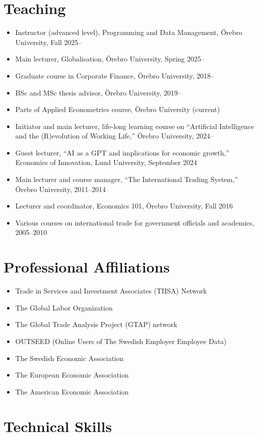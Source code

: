 \documentclass[11pt,a4paper]{article}
\newcommand{\cventry}[1]{\item #1}
\begin{document}
\section{Teaching}

\begin{itemize}
\cventry{Instructor (advanced level), Programming and Data Management, Örebro University, Fall 2025--}
 \cventry{Main lecturer, Globalisation, Örebro University, Spring 2025--}
 \cventry{Graduate course in Corporate Finance, Örebro University, 2018--}
 \cventry{BSc and MSc thesis advisor, Örebro University, 2019--}
 \cventry{Parts of Applied Econometrics course, Örebro University (current)}
 \cventry{Initiator and main lecturer, life-long learning course on ``Artificial Intelligence and the (R)evolution of Working Life,'' Örebro University, 2024--}
 \cventry{Guest lecturer, ``AI as a GPT and implications for economic growth,'' Economics of Innovation, Lund University, September 2024}
 \cventry{Main lecturer and course manager, ``The International Trading System,'' Örebro University, 2011--2014}
 \cventry{Lecturer and coordinator, Economics 101, Örebro University, Fall 2016}
 \cventry{Various courses on international trade for government officials and academics, 2005--2010}
\end{itemize}

\section{Professional Affiliations}

\begin{itemize}
 \cventry{Trade in Services and Investment Associates (TIISA) Network}
 \cventry{The Global Labor Organization}
 \cventry{The Global Trade Analysis Project (GTAP) network}
 \cventry{OUTSEED (Online Users of The Swedish Employer Employee Data)}
 \cventry{The Swedish Economic Association}
 \cventry{The European Economic Association}
 \cventry{The American Economic Association}
\end{itemize}

\section{Technical Skills}
\end{document}

